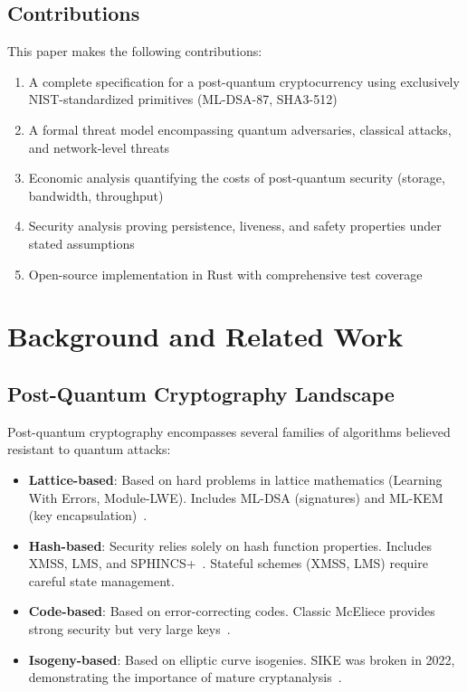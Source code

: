 \documentclass[11pt,a4paper]{article}
\begin{document}
\subsection{Contributions}

This paper makes the following contributions:

\begin{enumerate}
    \item A complete specification for a post-quantum cryptocurrency using exclusively NIST-standardized primitives (ML-DSA-87, SHA3-512)

    \item A formal threat model encompassing quantum adversaries, classical attacks, and network-level threats

    \item Economic analysis quantifying the costs of post-quantum security (storage, bandwidth, throughput)

    \item Security analysis proving persistence, liveness, and safety properties under stated assumptions

    \item Open-source implementation in Rust with comprehensive test coverage
\end{enumerate}

\section{Background and Related Work}

\subsection{Post-Quantum Cryptography Landscape}

Post-quantum cryptography encompasses several families of algorithms believed resistant to quantum attacks:

\begin{itemize}
    \item \textbf{Lattice-based}: Based on hard problems in lattice mathematics (Learning With Errors, Module-LWE). Includes ML-DSA (signatures) and ML-KEM (key encapsulation)~\cite{fips204,fips203}.

    \item \textbf{Hash-based}: Security relies solely on hash function properties. Includes XMSS, LMS, and SPHINCS+~\cite{sphincs}. Stateful schemes (XMSS, LMS) require careful state management.

    \item \textbf{Code-based}: Based on error-correcting codes. Classic McEliece provides strong security but very large keys~\cite{mceliece}.

    \item \textbf{Isogeny-based}: Based on elliptic curve isogenies. SIKE was broken in 2022, demonstrating the importance of mature cryptanalysis~\cite{castryck2022}.
\end{itemize}
\end{document}
